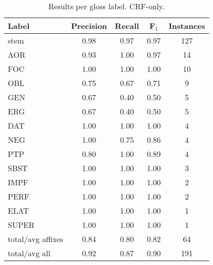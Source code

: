 
\begin{table}[h!]
\begin{center}
\begin{tabular}{lcccc}
\bf Label & \bf Precision & \bf Recall & \bf F$_1$& \bf Instances \\
\hline
stem &    0.98    &    0.97 &    0.97 &    127 \\
AOR    &    0.93    &    1.00 &    0.97 &    14 \\
FOC    &    1.00    &    1.00 &    1.00 &    10 \\
OBL &    0.75    &    0.67 &    0.71 &    9 \\
GEN    &    0.67    &    0.40 &    0.50 &    5 \\
ERG    &    0.67    &    0.40 &    0.50 &    5 \\
DAT    &    1.00    &    1.00 &    1.00 &    4 \\
NEG    &    1.00    &    0.75 &    0.86 &    4 \\
PTP    &    0.80    &    1.00 &    0.89 &    4 \\
SBST &    1.00    &    1.00 &    1.00 &    3 \\
IMPF &    1.00    &    1.00 &    1.00 &    2 \\
PERF &    1.00    &    1.00 &    1.00 &    2 \\
ELAT &    1.00    &    1.00 &    1.00 &    1 \\
SUPER &    1.00    &    1.00 &    1.00 &    1 \\
\hline
total/avg affixes & 0.84 & 0.80 & 0.82 & 64\\
total/avg all &    0.92 &    0.87 &    0.90 & 191 \\
\end{tabular}
\caption[Segmentation and Glossing Pilot Study Gloss Labels]{
Results per gloss label. CRF-only. 
}
\label{tab:pilot1CRFResults}
\end{center}
\end{table}

